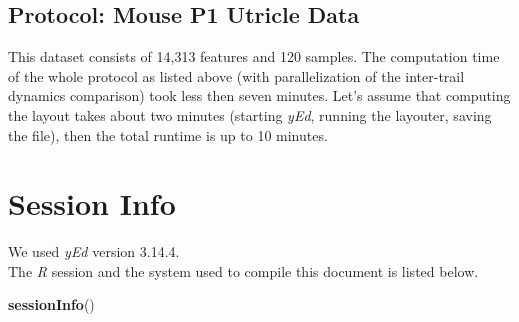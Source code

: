 \documentclass[]{book}
\newenvironment{Shaded}{\begin{snugshade}}{\end{snugshade}}
\newcommand{\KeywordTok}[1]{\textcolor[rgb]{0.13,0.29,0.53}{\textbf{#1}}}
\newcommand{\NormalTok}[1]{#1}
\theoremstyle{definition}
\theoremstyle{definition}
\theoremstyle{definition}
\theoremstyle{remark}
\begin{document}
\subsection{Protocol: Mouse P1 Utricle
Data}\label{protocol-mouse-p1-utricle-data}

This dataset consists of 14,313 features and 120 samples. The
computation time of the whole protocol as listed above (with
parallelization of the inter-trail dynamics comparison) took less then
seven minutes. Let's assume that computing the layout takes about two
minutes (starting \emph{yEd}, running the layouter, saving the file),
then the total runtime is up to 10 minutes.

\section{Session Info}\label{session-info}

We used \emph{yEd} version 3.14.4.\\
The \emph{R} session and the system used to compile this document is
listed below.

\begin{Shaded}
\begin{Highlighting}[]
\KeywordTok{sessionInfo}\NormalTok{()}
\end{Highlighting}
\end{Shaded}
\end{document}
